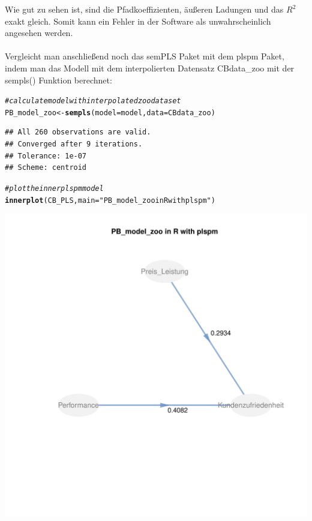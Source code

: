\documentclass{article}\usepackage[]{graphicx}\usepackage[]{color}
\makeatletter
\def\maxwidth{ %
  \ifdim\Gin@nat@width>\linewidth
    \linewidth
  \else
    \Gin@nat@width
  \fi
}
\newcommand{\hlstr}[1]{\textcolor[rgb]{0.192,0.494,0.8}{#1}}%
\newcommand{\hlcom}[1]{\textcolor[rgb]{0.678,0.584,0.686}{\textit{#1}}}%
\newcommand{\hlstd}[1]{\textcolor[rgb]{0.345,0.345,0.345}{#1}}%
\newcommand{\hlkwb}[1]{\textcolor[rgb]{0.69,0.353,0.396}{#1}}%
\newcommand{\hlkwc}[1]{\textcolor[rgb]{0.333,0.667,0.333}{#1}}%
\newcommand{\hlkwd}[1]{\textcolor[rgb]{0.737,0.353,0.396}{\textbf{#1}}}%
\newenvironment{kframe}{%
 \def\at@end@of@kframe{}%
 \ifinner\ifhmode%
  \def\at@end@of@kframe{\end{minipage}}%
  \begin{minipage}{\columnwidth}%
 \fi\fi%
 \def\FrameCommand##1{\hskip\@totalleftmargin \hskip-\fboxsep
 \colorbox{shadecolor}{##1}\hskip-\fboxsep
     \hskip-\linewidth \hskip-\@totalleftmargin \hskip\columnwidth}%
 \MakeFramed {\advance\hsize-\width
   \@totalleftmargin\z@ \linewidth\hsize
   \@setminipage}}%
 {\par\unskip\endMakeFramed%
 \at@end@of@kframe}
\newenvironment{knitrout}{}{} %
\makeatother
\begin{document}
\pagebreak

Wie gut zu sehen ist, sind die Pfadkoeffizienten, äußeren Ladungen und das $R^{2}$ exakt gleich. Somit kann ein Fehler in der Software als unwahrscheinlich angesehen werden.\\
\\


Vergleicht man anschließend noch das semPLS Paket mit dem plspm Paket, indem man das Modell mit dem interpolierten Datensatz CBdata\_zoo mit der sempls() Funktion berechnet:
\begin{knitrout}
\color{fgcolor}\begin{kframe}
\begin{alltt}
\hlcom{#calculate model with interpolated zoo dataset}
\hlstd{PB_model_zoo} \hlkwb{<-} \hlkwd{sempls}\hlstd{(}\hlkwc{model} \hlstd{= model,}\hlkwc{data} \hlstd{= CBdata_zoo)}
\end{alltt}
\begin{verbatim}
## All 260 observations are valid.
## Converged after 9 iterations.
## Tolerance: 1e-07
## Scheme: centroid
\end{verbatim}
\begin{alltt}
\hlcom{#plot the inner plspm model}
\hlkwd{innerplot}\hlstd{(CB_PLS,} \hlkwc{main} \hlstd{=}\hlstr{"PB_model_zoo in R with plspm"}\hlstd{)}
\end{alltt}
\end{kframe}
\includegraphics[width=\maxwidth]{figure/unnamed-chunk-1-1} 

\end{knitrout}
\end{document}
